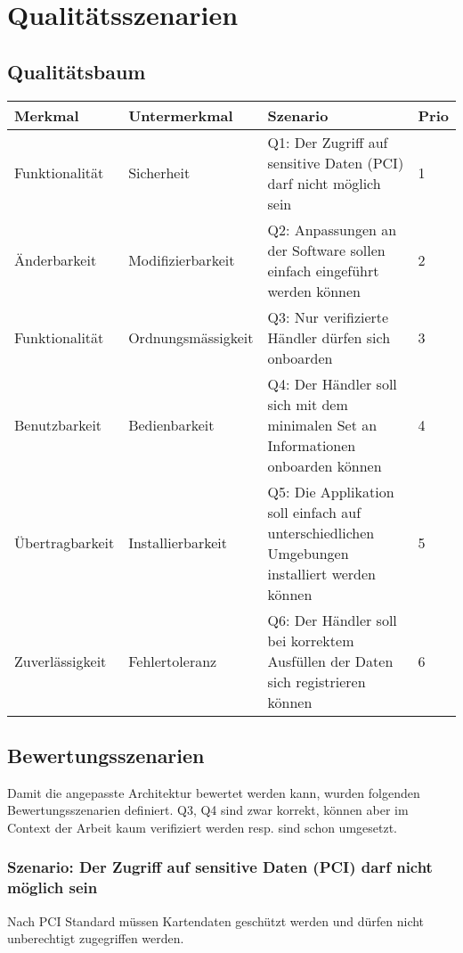 \chapter{Qualitätsszenarien}
\label{sec:qualityscenarios}

\section{Qualitätsbaum}
\begin{table}[H]
	\centering
	\begin{tabular}{ | p{3cm} | p{3.5cm} | p{6.5cm} | p{1cm} | }
		\toprule
		{\textbf{Merkmal}} & {\textbf{Untermerkmal}} & {\textbf{Szenario}} & {\textbf{Prio}} \\
		\midrule
		Funktionalität & Sicherheit & Q1: Der Zugriff auf sensitive Daten (PCI) darf nicht möglich sein & 1 \\ \hline
		Änderbarkeit & Modifizierbarkeit & Q2: Anpassungen an der Software sollen einfach eingeführt werden können & 2 \\ \hline
		Funktionalität & Ordnungsmässigkeit & Q3: Nur verifizierte Händler dürfen sich onboarden & 3 \\ \hline
		Benutzbarkeit & Bedienbarkeit & Q4: Der Händler soll sich mit dem minimalen Set an Informationen onboarden können & 4 \\ \hline
		Übertragbarkeit & Installierbarkeit & Q5: Die Applikation soll einfach auf unterschiedlichen Umgebungen installiert werden können & 5 \\ \hline
		Zuverlässigkeit & Fehlertoleranz & Q6: Der Händler soll bei korrektem Ausfüllen der Daten sich registrieren können & 6 \\
		\bottomrule
	\end{tabular}
\end{table}
\newpage
\section{Bewertungsszenarien}

Damit die angepasste Architektur bewertet werden kann, wurden folgenden Bewertungsszenarien definiert. 
Q3, Q4 sind zwar korrekt, können aber im Context der Arbeit kaum verifiziert werden resp. sind schon umgesetzt.

\subsection{Szenario: Der Zugriff auf sensitive Daten (PCI) darf nicht möglich sein}
Nach PCI Standard müssen Kartendaten geschützt werden und dürfen nicht unberechtigt zugegriffen werden. 


